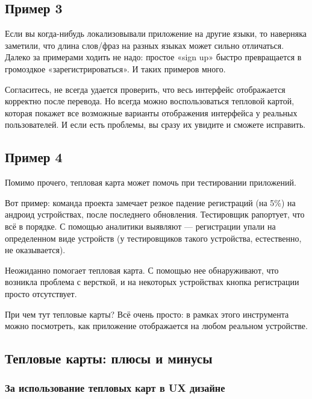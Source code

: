 \documentclass{article}
\begin{document}
\subsection{Пример 3}

Если вы когда-нибудь локализовывали приложение на другие языки, то наверняка заметили, что длина слов/фраз на разных языках может сильно отличаться. Далеко за примерами ходить не надо: простое «sign up» быстро превращается в громоздкое «зарегистрироваться». И таких примеров много.

Согласитесь, не всегда удается проверить, что весь интерфейс отображается корректно после перевода. Но всегда можно воспользоваться тепловой картой, которая покажет все возможные варианты отображения интерфейса у реальных пользователей. И если есть проблемы, вы сразу их увидите и сможете исправить.


\subsection{Пример 4}

Помимо прочего, тепловая карта может помочь при тестировании приложений.

Вот пример: команда проекта замечает резкое падение регистраций (на 5\%) на андроид устройствах, после последнего обновления. Тестировщик рапортует, что всё в порядке. С помощью аналитики выявляют — регистрации упали на определенном виде устройств (у тестировщиков такого устройства, естественно, не оказывается).

Неожиданно помогает тепловая карта. С помощью нее обнаруживают, что возникла проблема с версткой, и на некоторых устройствах кнопка регистрации просто отсутствует.

При чем тут тепловые карты? Всё очень просто: в рамках этого инструмента можно посмотреть, как приложение отображается на любом реальном устройстве.


\subsection{Тепловые карты: плюсы и минусы}

\subsubsection{За использование тепловых карт в UX дизайне}
\end{document}
